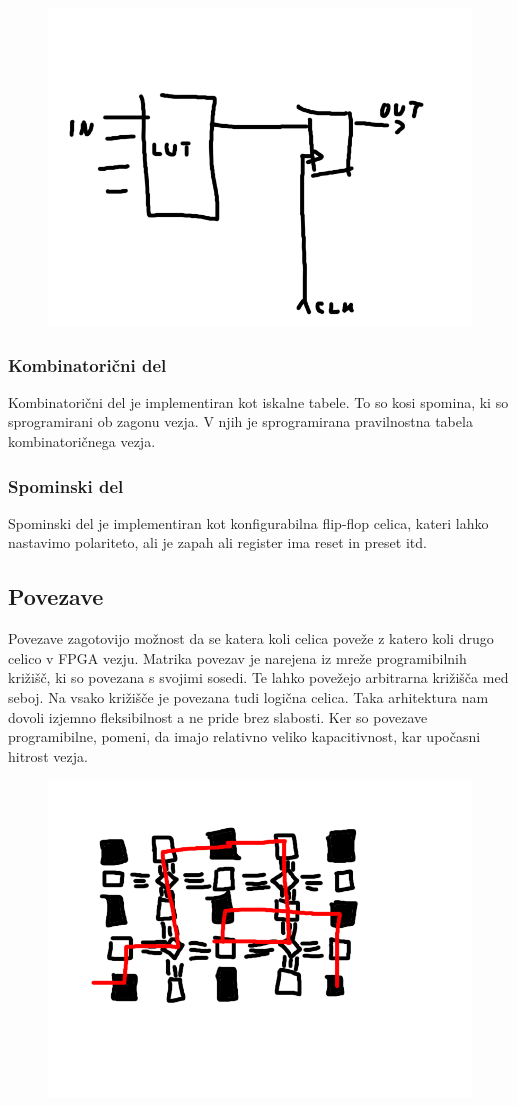 \begin{figure}
	\centering
	\includegraphics[width=0.7\linewidth]{slike/cell}
	\caption{}
	\label{fig:cell}
\end{figure}

\subsubsection{Kombinatorični del}
Kombinatorični del je implementiran kot iskalne tabele. To so kosi spomina, ki so sprogramirani ob zagonu vezja. V njih je sprogramirana pravilnostna tabela kombinatoričnega vezja.

\subsubsection{Spominski del}
Spominski del je implementiran kot konfigurabilna flip-flop celica, kateri lahko nastavimo polariteto, ali je zapah ali register ima reset in preset itd.


\subsection{Povezave}
Povezave zagotovijo možnost da se katera koli celica poveže z katero koli drugo celico v FPGA vezju. Matrika povezav je narejena iz mreže programibilnih križišč, ki so povezana s svojimi sosedi. Te lahko povežejo arbitrarna križišča med seboj. Na vsako križišče je povezana tudi logična celica. Taka arhitektura nam dovoli izjemno fleksibilnost a ne pride brez slabosti. Ker so povezave programibilne, pomeni, da imajo relativno veliko kapacitivnost, kar upočasni hitrost vezja.


\begin{figure}
	\centering
	\includegraphics[width=0.7\linewidth]{slike/routing}
	\caption{}
	\label{fig:cell}
\end{figure}


